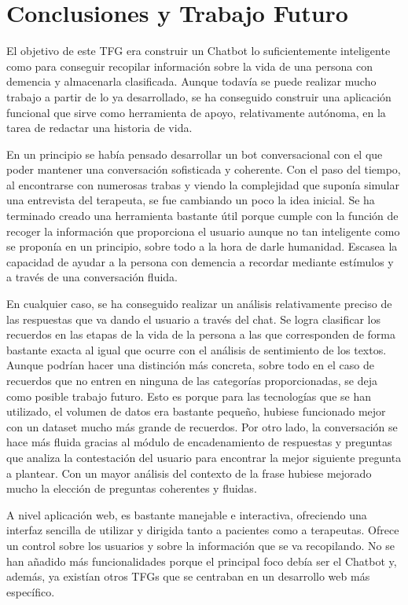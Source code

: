 \chapter{Conclusiones y Trabajo Futuro}
\label{cap:conclusiones}

El objetivo de este TFG era construir un Chatbot lo suficientemente inteligente como para conseguir recopilar información sobre la vida de una persona con demencia y almacenarla clasificada. Aunque todavía se puede realizar mucho trabajo a partir de lo ya desarrollado, se ha conseguido construir una aplicación funcional que sirve como herramienta de apoyo, relativamente autónoma, en la tarea de redactar una historia de vida. 

En un principio se había pensado desarrollar un bot conversacional con el que poder mantener una conversación sofisticada y coherente. Con el paso del tiempo, al encontrarse con numerosas trabas y viendo la complejidad que suponía simular una entrevista del terapeuta, se fue cambiando un poco la idea inicial. Se ha terminado creado una herramienta bastante útil porque cumple con la función de recoger la información que proporciona el usuario aunque no tan inteligente como se proponía en un principio, sobre todo a la hora de darle humanidad. Escasea la capacidad de ayudar a la persona con demencia a recordar mediante estímulos y a través de una conversación fluida. 

En cualquier caso, se ha conseguido realizar un análisis relativamente preciso de las respuestas que va dando el usuario a través del chat. Se logra clasificar los recuerdos en las etapas de la vida de la persona a las que corresponden de forma bastante exacta al igual que ocurre con el análisis de sentimiento de los textos. Aunque podrían hacer una distinción más concreta, sobre todo en el caso de recuerdos que no entren en ninguna de las categorías proporcionadas, se deja como posible trabajo futuro. Esto es porque para las tecnologías que se han utilizado, el volumen de datos era bastante pequeño, hubiese funcionado mejor con un dataset mucho más grande de recuerdos. Por otro lado, la conversación se hace más fluida gracias al módulo de encadenamiento de respuestas y preguntas que analiza la contestación del usuario para encontrar la mejor siguiente pregunta a plantear. Con un mayor análisis del contexto de la frase hubiese mejorado mucho la elección de preguntas coherentes y fluidas.

A nivel aplicación web, es bastante manejable e interactiva, ofreciendo una interfaz sencilla de utilizar y  dirigida tanto a pacientes como a terapeutas. Ofrece un control sobre los usuarios y sobre la información que se va recopilando. No se han añadido más funcionalidades porque el principal foco debía ser el Chatbot y, además, ya existían otros TFGs que se centraban en un desarrollo web más específico. 

